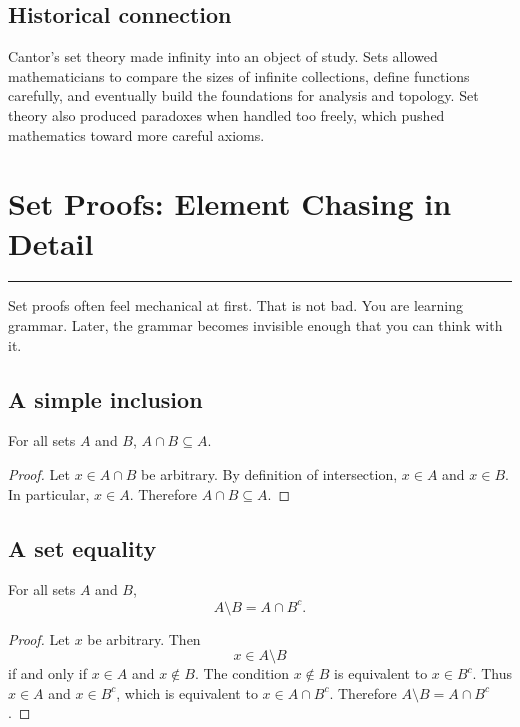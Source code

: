 \documentclass[12pt]{article}
\newcommand{\chapterline}{\vspace{0.4em}\hrule\vspace{0.8em}}
\begin{document}
\subsection{Historical connection}

Cantor's set theory made infinity into an object of study. Sets allowed mathematicians to compare the sizes of infinite collections, define functions carefully, and eventually build the foundations for analysis and topology. Set theory also produced paradoxes when handled too freely, which pushed mathematics toward more careful axioms.

\newpage
\section{Set Proofs: Element Chasing in Detail}
\chapterline

Set proofs often feel mechanical at first. That is not bad. You are learning grammar. Later, the grammar becomes invisible enough that you can think with it.

\subsection{A simple inclusion}

\begin{theorem}
For all sets $A$ and $B$, $A\cap B\subseteq A$.
\end{theorem}

\begin{proof}
Let $x\in A\cap B$ be arbitrary. By definition of intersection, $x\in A$ and $x\in B$. In particular, $x\in A$. Therefore $A\cap B\subseteq A$.
\end{proof}

\subsection{A set equality}

\begin{theorem}
For all sets $A$ and $B$,
\[
A\setminus B=A\cap B^c.
\]
\end{theorem}

\begin{proof}
Let $x$ be arbitrary. Then
\[
x\in A\setminus B
\]
if and only if $x\in A$ and $x\notin B$. The condition $x\notin B$ is equivalent to $x\in B^c$. Thus $x\in A$ and $x\in B^c$, which is equivalent to $x\in A\cap B^c$. Therefore $A\setminus B=A\cap B^c$.
\end{proof}
\end{document}
